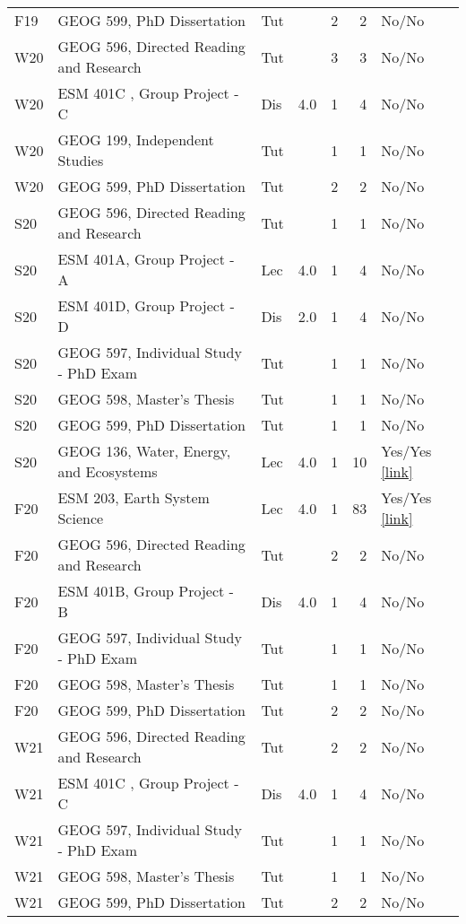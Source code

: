 \begin{longtable}{lp{7cm}p{0.75cm}rrrp{2.5cm}}
F19 & GEOG 599, PhD Dissertation & Tut &  & 2 & 2 & No/No    \\ 
W20 & GEOG 596, Directed Reading and Research & Tut &  & 3 & 3 & No/No    \\ 
W20 & ESM 401C , Group Project - C & Dis & 4.0 & 1 & 4 & No/No    \\ 
W20 & GEOG 199, Independent Studies & Tut &  & 1 & 1 & No/No    \\ 
W20 & GEOG 599, PhD Dissertation & Tut &  & 2 & 2 & No/No    \\ 
S20 & GEOG 596, Directed Reading and Research & Tut &  & 1 & 1 & No/No    \\ 
S20 & ESM 401A, Group Project - A & Lec & 4.0 & 1 & 4 & No/No    \\ 
S20 & ESM 401D, Group Project - D & Dis & 2.0 & 1 & 4 & No/No    \\ 
S20 & GEOG 597, Individual Study - PhD Exam & Tut &  & 1 & 1 & No/No    \\ 
S20 & GEOG 598, Master’s Thesis & Tut &  & 1 & 1 & No/No    \\ 
S20 & GEOG 599, PhD Dissertation & Tut &  & 1 & 1 & No/No    \\ 
S20 & GEOG 136, Water, Energy, and Ecosystems & Lec & 4.0 & 1 & 10 & Yes/Yes  \href{https://ucsb.box.com/s/4k3squfamwz4gg5mj2q79wo5qk29bubb}{[link]}  \\ 
F20 & ESM 203, Earth System Science & Lec & 4.0 & 1 & 83 & Yes/Yes  \href{https://ucsb.box.com/s/x8g8gcl7mtfahclm1zledaita1z5tgin}{[link]}  \\ 
F20 & GEOG 596, Directed Reading and Research & Tut &  & 2 & 2 & No/No    \\ 
F20 & ESM 401B, Group Project - B & Dis & 4.0 & 1 & 4 & No/No    \\ 
F20 & GEOG 597, Individual Study - PhD Exam & Tut &  & 1 & 1 & No/No    \\ 
F20 & GEOG 598, Master’s Thesis & Tut &  & 1 & 1 & No/No    \\ 
F20 & GEOG 599, PhD Dissertation & Tut &  & 2 & 2 & No/No    \\ 
W21 & GEOG 596, Directed Reading and Research & Tut &  & 2 & 2 & No/No    \\ 
W21 & ESM 401C , Group Project - C & Dis & 4.0 & 1 & 4 & No/No    \\ 
W21 & GEOG 597, Individual Study - PhD Exam & Tut &  & 1 & 1 & No/No    \\ 
W21 & GEOG 598, Master’s Thesis & Tut &  & 1 & 1 & No/No    \\ 
W21 & GEOG 599, PhD Dissertation & Tut &  & 2 & 2 & No/No    \\ 

\end{longtable}
